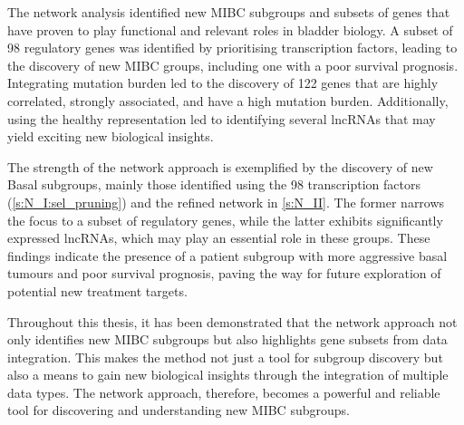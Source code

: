 The network analysis identified new MIBC subgroups and subsets of genes that have proven to play functional and relevant roles in bladder biology. A subset of 98 regulatory genes was identified by prioritising transcription factors, leading to the discovery of new MIBC groups, including one with a poor survival prognosis. Integrating mutation burden led to the discovery of 122 genes that are highly correlated, strongly associated, and have a high mutation burden. Additionally, using the healthy representation led to identifying several lncRNAs that may yield exciting new biological insights.

% 
The strength of the network approach is exemplified by the discovery of new Basal subgroups, mainly those identified using the 98 transcription factors (\cref{s:N_I:sel_pruning}) and the refined network in \cref{s:N_II}. The former narrows the focus to a subset of regulatory genes, while the latter exhibits significantly expressed lncRNAs, which may play an essential role in these groups. These findings indicate the presence of a patient subgroup with more aggressive basal tumours and poor survival prognosis, paving the way for future exploration of potential new treatment targets.

Throughout this thesis, it has been demonstrated that the network approach not only identifies new MIBC subgroups but also highlights gene subsets from data integration. This makes the method not just a tool for subgroup discovery but also a means to gain new biological insights through the integration of multiple data types. The network approach, therefore, becomes a powerful and reliable tool for discovering and understanding new MIBC subgroups.